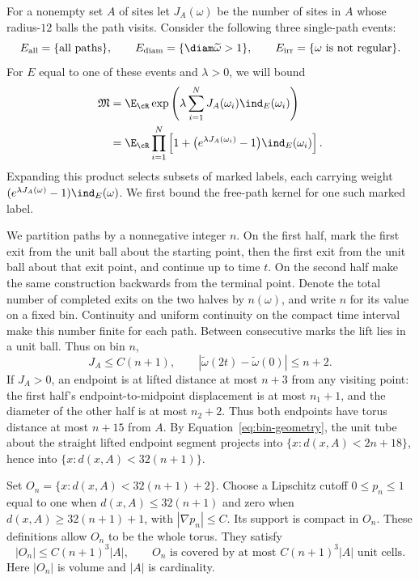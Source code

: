 For a nonempty set $A$ of sites let $J_A(\omega)$ be the
number of sites in $A$ whose radius-$12$ balls the path visits.
Consider the following three single-path events:
\[
 E_{\rm all}=\{\text{all paths}\},\qquad
 E_{\rm diam}=\{\diam\widetilde\omega>1\},\qquad
 E_{\rm irr}=\{\omega\text{ is not regular}\}.
\]
For $E$ equal to one of these events and $\lambda>0$, we will bound
\begin{equation}\label{eq:marked-moment-definition}
 \begin{split}
 \mathfrak M
 &=\E_{\cR}\exp\left(
   \lambda\sum_{i=1}^N J_A(\omega_i)\ind_E(\omega_i)\right)\\
 &=\E_{\cR}\prod_{i=1}^N
   \left[1+\bigl(e^{\lambda J_A(\omega_i)}-1\bigr)
                                      \ind_E(\omega_i)\right].
 \end{split}
\end{equation}
Expanding this product selects subsets of marked labels, each carrying
weight $(e^{\lambda J_A(\omega)}-1)\ind_E(\omega)$.
We first bound the free-path kernel for one such marked label.

We partition paths by a nonnegative integer $n$.  On the first
half, mark the first exit from the unit ball about the starting
point, then the first exit from the unit ball about that exit
point, and continue up to time $t$.  On the second half make
the same construction backwards from the terminal point.
Denote the total number of completed exits on the two halves by
$n(\omega)$, and write $n$ for its value on a fixed bin.
Continuity and uniform continuity on the compact time interval
make this number finite for each path.  Between consecutive
marks the lift lies in a unit ball.  Thus on bin $n$,
\begin{equation}\label{eq:bin-geometry}
 J_A\le C(n+1),\qquad
 |\widetilde\omega(2t)-\widetilde\omega(0)|\le n+2.
\end{equation}
If $J_A>0$, an endpoint is at lifted distance at most
$n+3$ from any visiting point: the first half's
endpoint-to-midpoint displacement is at most $n_1+1$,
and the diameter of the other half is at most $n_2+2$.
Thus both endpoints have torus distance at most $n+15$
from $A$.  By Equation~\eqref{eq:bin-geometry}, the unit
tube about the straight lifted endpoint segment projects
into $\{x:d(x,A)<2n+18\}$, hence into
$\{x:d(x,A)<32(n+1)\}$.

Set $O_n=\{x:d(x,A)<32(n+1)+2\}$.  Choose a Lipschitz
cutoff $0\le p_n\le1$ equal to one when
$d(x,A)\le32(n+1)$ and zero when
$d(x,A)\ge32(n+1)+1$, with $|\nabla p_n|\le C$.
Its support is compact in $O_n$.  These definitions
allow $O_n$ to be the whole torus.  They satisfy
\begin{equation}\label{eq:bin-volume}
 |O_n|\le C(n+1)^3|A|,
 \qquad O_n\text{ is covered by at most }C(n+1)^3|A|
 \text{ unit cells}.
\end{equation}
Here $|O_n|$ is volume and $|A|$ is cardinality.

